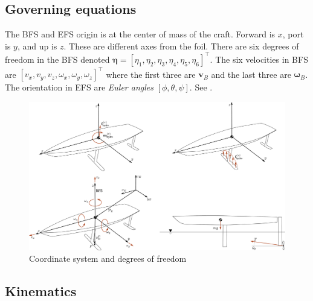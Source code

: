 \documentclass[10pt]{article}
\newcommand{\mbf}[1]{\mathbf{#1}}
\begin{document}
\subsection{Governing equations}
% 
The BFS and EFS origin is at the center of mass of the craft.
Forward is $x$, port is $y$, and up is $z$.
These are different axes from the foil.
There are six degrees of freedom in the BFS denoted $\boldsymbol{\eta} = [\eta_1,\eta_2,\eta_3,\eta_4,\eta_5,\eta_6]^{\top}$.
The six velocities in BFS are $[v_x,v_y,v_z,\omega_x,\omega_y,\omega_z]^{\top}$ where the first three are $\mbf{v}_B$ and the last three are $\boldsymbol{\omega}_B$.
The orientation in EFS are \emph{Euler angles} $[\phi, \theta, \psi]$.
See .
\begin{figure}[htb!]
	\centering
	\includegraphics[width=0.6\linewidth,clip,trim={0cm 0cm 37cm 20cm}]{SeakeepingDiagram.pdf}
	\caption{\label{fig:Coordinates}Coordinate system and degrees of freedom}
\end{figure}
\subsection{Kinematics}
\end{document}
